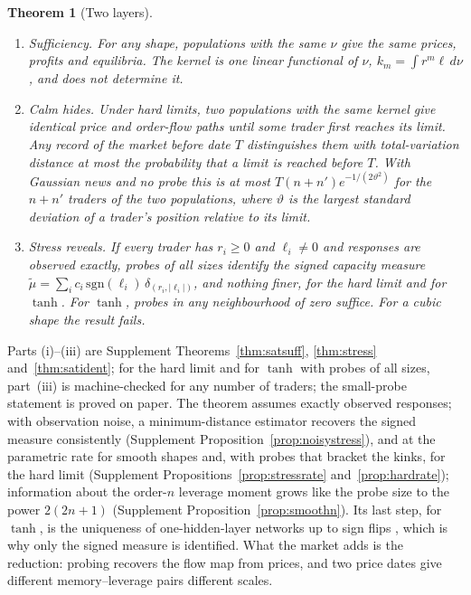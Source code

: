 \documentclass[12pt]{article}
\newtheorem{theorem}{Theorem}[section]
\theoremstyle{definition}
\theoremstyle{remark}
\begin{document}
\begin{theorem}[Two layers]\label{n:sat_thm}
\begin{enumerate}[label=(\roman*),itemsep=1pt]
\item \emph{Sufficiency.} For any shape, populations with the same $\nu$ give the same prices, profits and equilibria. The kernel is one linear functional of $\nu$, $k_m=\int r^m\ell\,d\nu$, and does not determine it.
\item \emph{Calm hides.} Under hard limits, two populations with the same kernel give identical price and order-flow paths until some trader first reaches its limit. Any record of the market before date $T$ distinguishes them with total-variation distance at most the probability that a limit is reached before $T$. With Gaussian news and no probe this is at most $T(n+n')e^{-1/(2\vartheta^2)}$ for the $n+n'$ traders of the two populations, where $\vartheta$ is the largest standard deviation of a trader's position relative to its limit.
\item \emph{Stress reveals.} If every trader has $r_i\ge0$ and $\ell_i\ne0$ and responses are observed exactly, probes of all sizes identify the signed capacity measure $\tilde\mu=\sum_ic_i\,\mathrm{sgn}(\ell_i)\,\delta_{(r_i,|\ell_i|)}$, and nothing finer, for the hard limit and for $\tanh$. For $\tanh$, probes in any neighbourhood of zero suffice. For a cubic shape the result fails.
\end{enumerate}
\end{theorem}

Parts (i)--(iii) are Supplement Theorems~\ref{thm:satsuff}, \ref{thm:stress} and~\ref{thm:satident}; for the hard limit and for $\tanh$ with probes of all sizes, part~(iii) is machine-checked for any number of traders; the small-probe statement is proved on paper. The theorem assumes exactly observed responses; with observation noise, a minimum-distance estimator recovers the signed measure consistently (Supplement Proposition~\ref{prop:noisystress}), and at the parametric rate for smooth shapes and, with probes that bracket the kinks, for the hard limit (Supplement Propositions~\ref{prop:stressrate} and~\ref{prop:hardrate}); information about the order-$n$ leverage moment grows like the probe size to the power $2(2n+1)$ (Supplement Proposition~\ref{prop:smoothn}). Its last step, for $\tanh$, is the uniqueness of one-hidden-layer networks up to sign flips \citep{sussmann1992}, which is why only the signed measure is identified. What the market adds is the reduction: probing recovers the flow map from prices, and two price dates give different memory--leverage pairs different scales.
\end{document}
